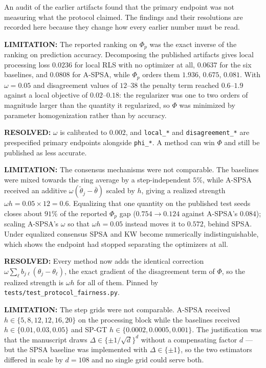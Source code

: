 \documentclass[11pt]{article}
\newcommand{\Warning}[1]{\par\noindent\textcolor{warning}{\textbf{LIMITATION:} #1}\par}
\newcommand{\Resolved}[1]{\par\noindent\textcolor{confirmed}{\textbf{RESOLVED:} #1}\par}
\begin{document}
An audit of the earlier artifacts found that the primary endpoint was not
measuring what the protocol claimed. The findings and their resolutions are
recorded here because they change how every earlier number must be read.

\Warning{The reported ranking on $\Phi_p$ was the exact inverse of the ranking
on prediction accuracy. Decomposing the published artifacts gives local
processing loss $0.0236$ for local RLS with no optimizer at all, $0.0637$ for
the six baselines, and $0.0808$ for A-SPSA, while $\Phi_p$ orders them
$1.936$, $0.675$, $0.081$. With $\omega=0.05$ and disagreement values of
$12$--$38$ the penalty term reached $0.6$--$1.9$ against a local objective of
$0.02$--$0.18$: the regularizer was one to two orders of magnitude larger than
the quantity it regularized, so $\Phi$ was minimized by parameter
homogenization rather than by accuracy.}

\Resolved{$\omega$ is calibrated to $0.002$, and \texttt{local\_*} and
\texttt{disagreement\_*} are prespecified primary endpoints alongside
\texttt{phi\_*}. A method can win $\Phi$ and still be published as less
accurate.}

\Warning{The consensus mechanisms were not comparable. The baselines were
mixed towards the ring average by a step-independent $5\%$, while A-SPSA
received an additive $\omega(\tilde\theta_j-\bar\theta)$ scaled by $h$, giving
a realized strength $\omega h = 0.05 \times 12 = 0.6$. Equalizing that one
quantity on the published test seeds closes about $91\%$ of the reported
$\Phi_p$ gap ($0.754 \to 0.124$ against A-SPSA's $0.084$); scaling A-SPSA's
$\omega$ so that $\omega h = 0.05$ instead moves it to $0.572$, behind SPSA.
Under equalized consensus SPSA and KW become numerically indistinguishable,
which shows the endpoint had stopped separating the optimizers at all.}

\Resolved{Every method now adds the identical correction
$\omega\sum_\ell b_{j\ell}(\theta_j-\theta_\ell)$, the exact gradient of the
disagreement term of $\Phi$, so the realized strength is $\omega h$ for all of
them. Pinned by \texttt{tests/test\_protocol\_fairness.py}.}

\Warning{The step grids were not comparable. A-SPSA received
$h\in\{5,8,12,12,16,20\}$ on the processing block while the baselines received
$h\in\{0.01,0.03,0.05\}$ and SP-GT $h\in\{0.0002,0.0005,0.001\}$. The
justification was that the manuscript draws $\Delta\in\{\pm 1/\sqrt d\}^d$
without a compensating factor $d$ --- but the SPSA baseline was implemented
with $\Delta\in\{\pm 1\}$, so the two estimators differed in scale by
$d=108$ and no single grid could serve both.}
\end{document}
